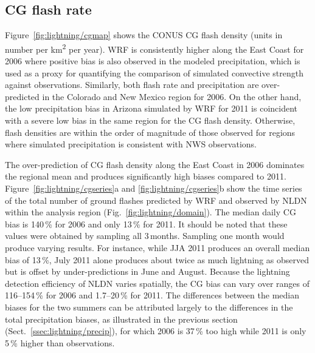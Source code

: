 
\subsection{CG flash rate}\label{ssec:lightning/flashrate}

Figure~\ref{fig:lightning/cgmap} shows the CONUS CG flash density (units in number per
\unit{km^2} per year). WRF is consistently higher along the East Coast for
2006 where positive bias is also observed in the modeled precipitation, which
is used as a proxy for quantifying the comparison of simulated convective
strength against observations. Similarly, both flash rate and precipitation
are over-predicted in the Colorado and New Mexico region for 2006. On the
other hand, the low precipitation bias in Arizona simulated by WRF for 2011
is coincident with a severe low bias in the same region for the CG flash
density. Otherwise, flash densities are within the order of magnitude of
those observed for regions where simulated precipitation is consistent with
NWS observations.


The over-prediction of CG flash density along the East Coast in 2006
dominates the regional mean and produces significantly high biases compared
to 2011. Figure~\ref{fig:lightning/cgseries}a and \ref{fig:lightning/cgseries}b show the time
series of the total number of ground flashes predicted by WRF and observed by
NLDN within the analysis region (Fig.~\ref{fig:lightning/domain}). The median daily CG
bias is 140\,{\%} for 2006 and only 13\,{\%} for 2011. It should be noted
that these values were obtained by sampling all 3\,months. Sampling one month
would produce varying results. For instance, while JJA 2011 produces an
overall median bias of 13\,{\%}, July 2011 alone produces about twice as much
lightning as observed but is offset by under-predictions in June and August.
Because the lightning detection efficiency of NLDN varies spatially, the CG
bias can vary over ranges of 116--154\,{\%} for 2006 and 1.7--20\,{\%} for 2011.
The differences between the median biases for the two
summers can be attributed largely to the differences in the total
precipitation biases, as illustrated in the previous section
(Sect.~\ref{ssec:lightning/precip}), for which 2006 is 37\,{\%} too high while 2011 is
only 5\,{\%} higher than observations.

